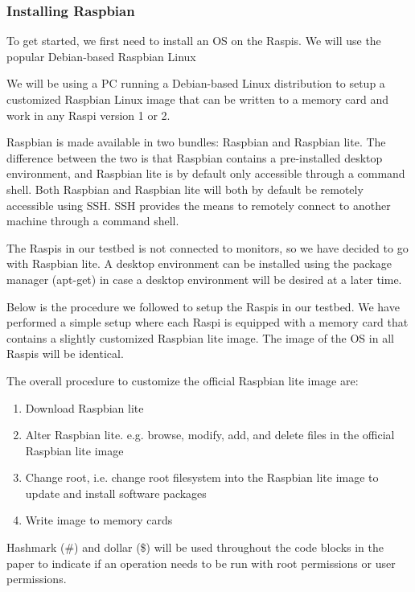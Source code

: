 \subsubsection{Installing Raspbian}

To get started, we first need to install an \ac{OS} on the
\ac{Raspi}s. We will use the popular Debian-based Raspbian
Linux~\cite{raspbian}

We will be using a \ac{PC} running a Debian-based Linux distribution
to setup a customized Raspbian Linux image that can be written to
a memory card and work in any \ac{Raspi} version 1 or 2.

Raspbian is made available in two bundles: Raspbian and Raspbian lite.
The difference between the two is that Raspbian contains a pre-installed desktop
environment, and Raspbian lite is by default only accessible through a 
command shell. Both Raspbian and Raspbian lite will both by default be remotely
accessible using \ac{SSH}. \ac{SSH} provides the means to remotely
connect to another machine through a command shell.

The \ac{Raspi}s in our testbed is not connected to monitors, so we
have decided to go with Raspbian lite.
A desktop environment can be installed using the package manager
(apt-get) in case a desktop environment will be desired at a later
time.

Below is the procedure we followed to setup the \ac{Raspi}s in our testbed. We
have performed a simple setup where each \ac{Raspi} is equipped with a
memory card that contains a slightly customized Raspbian lite image. The image
of the \ac{OS} in all \ac{Raspi}s will be identical.

The overall procedure to customize the official Raspbian lite image
are:
\begin{enumerate}
    \item Download Raspbian lite
    \item Alter Raspbian lite. e.g. browse, modify, add, and delete files
        in the official Raspbian lite image
    \item Change root, i.e. change root filesystem into the Raspbian lite
        image to update and install software packages
    \item Write image to memory cards
\end{enumerate}

Hashmark (\#) and dollar (\$) will be used throughout the code blocks in
the paper to indicate if an operation needs to be run with root permissions or
user permissions.

